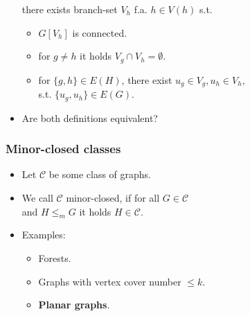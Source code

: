 \documentclass[t,usenames,dvipsnames]{beamer}
\begin{document}
\begin{frame}
\begin{itemize}[<+->]
			there exists branch-set $V_h$ f.a. $h \in V(h)$ s.t.
			\begin{itemize}
				\item $G[V_h]$ is connected.
				\item for $g \neq h$ it holds $V_g \cap V_h = \emptyset$.
				\item for $\{g,h\} \in E(H)$, there exist $u_g \in V_g, u_h
					\in V_h$,\\
					s.t. $\{u_g, u_h\} \in E(G)$.
			\end{itemize}
		\item Are both definitions equivalent?
	\end{itemize}
\end{frame}
\begin{frame} \frametitle{Minor-closed classes}
	\begin{itemize}[<+->]
		\item Let $\mathcal{C}$ be some class of graphs.
		\item We call $\mathcal{C}$ minor-closed, if for all $G \in
			\mathcal{C}$\\
			\hspace{1cm}and $H\leq_m G$ it holds $H \in \mathcal{C}$.
			\\ \vspace{1cm}
		\item Examples:
			\begin{itemize}
				\item Forests.
				\item Graphs with vertex cover number $\leq k$.
				\item \textbf{Planar graphs}.
			\end{itemize}
	\end{itemize}
\end{frame}
\end{document}
